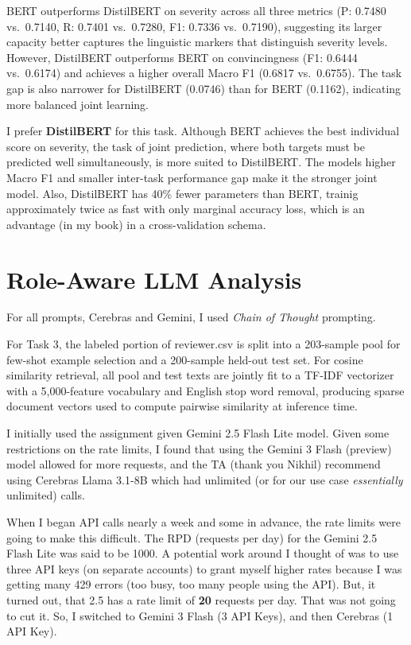 \documentclass[12pt]{article}
\begin{document}
BERT outperforms DistilBERT on severity across all three metrics (P: 0.7480 vs.\ 0.7140, R: 0.7401 
vs.\ 0.7280, F1: 0.7336 vs.\ 0.7190), suggesting its larger capacity better captures the linguistic 
markers that distinguish severity levels. However, DistilBERT outperforms BERT on convincingness 
(F1: 0.6444 vs.\ 0.6174) and achieves a higher overall Macro F1 (0.6817 vs.\ 0.6755). The task gap 
is also narrower for DistilBERT (0.0746) than for BERT (0.1162), indicating more balanced joint learning.

I prefer \textbf{DistilBERT} for this task. Although BERT achieves the best individual score on severity, the 
task of joint prediction, where both targets must be predicted well simultaneously, is more suited to 
DistilBERT. The models higher Macro F1 and smaller inter-task performance gap make it the stronger 
joint model. Also, DistilBERT has 40\% fewer parameters than BERT, trainig approximately twice as 
fast with only marginal accuracy loss, which is an advantage (in my book) in a cross-validation schema.

\section{Role-Aware LLM Analysis}

\begin{important}
    For all prompts, Cerebras and Gemini, I used \textit{Chain of Thought} prompting.
\end{important}

For Task 3, the labeled portion of reviewer.csv is split into a 203-sample pool for 
few-shot example selection and a 200-sample held-out test set. For cosine similarity 
retrieval, all pool and test texts are jointly fit to a TF-IDF vectorizer with a 
5,000-feature vocabulary and English stop word removal, producing sparse document 
vectors used to compute pairwise similarity at inference time.

I initially used the assignment given Gemini 2.5 Flash Lite model. Given some 
restrictions on the rate limits, I found that using the Gemini 3 Flash (preview) model allowed for 
more requests, and the TA (thank you Nikhil) recommend using Cerebras Llama 3.1-8B which had unlimited 
(or for our use case \textit{essentially} unlimited) calls.

When I began API calls nearly a week and some in advance, the rate limits were going to make this difficult. The RPD 
(requests per day) for the Gemini 2.5 Flash Lite was said to be 1000. A potential work around I thought of was to use 
three API keys (on separate accounts) to grant myself higher rates because I was getting many 429 errors (too busy, too many 
people using the API). But, it turned out, that 2.5 has a rate limit of \textbf{20} requests per day. That was not 
going to cut it. So, I switched to Gemini 3 Flash (3 API Keys), and then Cerebras (1 API Key).
\end{document}
